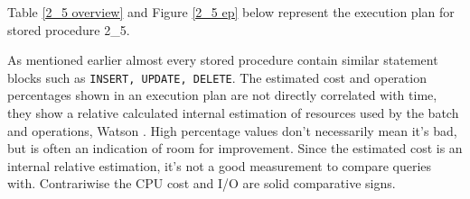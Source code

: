 \documentclass{cslthse-msc}
\begin{document}
Table \ref{2_5 overview} and Figure \ref{2_5 ep} below represent the execution plan for stored procedure 2\_5.
\begin{table}[H]
\centering
{}
\caption{Overview of stored procedure 2\_5's statement blocks in execution plan}
\label{2_5 overview}
\end{table}

\noindent As mentioned earlier almost every stored procedure contain similar statement blocks such as \texttt{INSERT, UPDATE, DELETE}. The estimated cost and operation percentages shown in an execution plan are not directly correlated with time, they show a relative calculated internal estimation of resources used by the batch and operations, Watson \cite{cost}. High percentage values don't necessarily mean it's bad, but is often an indication of room for improvement. Since the estimated cost is an internal relative estimation, it's not a good measurement to compare queries with. Contrariwise the CPU cost and I/O are solid comparative signs.
\end{document}
